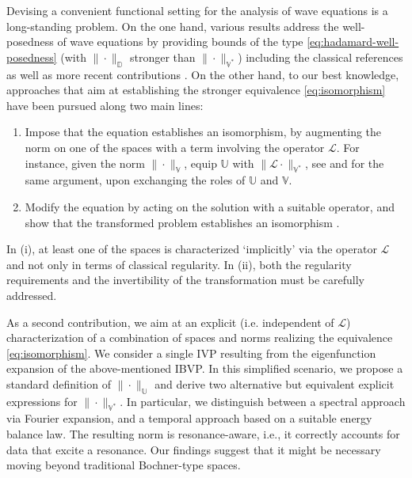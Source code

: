 \documentclass{amsart}
\theoremstyle{plain}
\theoremstyle{remark}
\numberwithin{equation}{section}
\numberwithin{theorem}{section}
\newcommand{\trial}{\mathbb{U}}
\newcommand{\test}{\mathbb{V}}
\newcommand{\data}{\mathbb{V}^*}
\begin{document}
Devising a convenient functional setting for the analysis of wave equations is a long-standing problem. On the one hand, various results address the well-posedness of wave equations by providing bounds of the type \eqref{eq:hadamard-well-posedness} (with $\|\cdot\|_{\mathbb{D}}$  stronger than  $\|\cdot\|_{\data}$) including the classical references \cite{Dautray.Lions:92, Evans:10, Ladyzhenskaya:85, Lions.Magenes:72} as well as more recent contributions \cite{Dong.Gergoulis.Mascotto.Wang:25, Dong.Mascotto.Wang:25, Ferrari.Perugia:25, Ferrari.Perugia.Zampa:25}.
On the other hand, to our best knowledge, approaches that aim at establishing the stronger equivalence \eqref{eq:isomorphism} have been pursued along two main lines:
\begin{enumerate}[label=(\roman*)]
	\item Impose that the equation establishes an isomorphism, by augmenting the norm on one of the spaces with a term involving the operator $\mathcal{L}$. For instance, given the norm $\|\cdot\|_{\test}$, equip $\trial$ with $\|\mathcal{L}\cdot \|_{\data}$, see \cite{Bignardi.Moiola:25, Fuhrer.Gonzalez.Karkulik:25, Steinbach.Zank:22, Zank:20} and \cite{Henning.Palitta.Simoncini.Urban:22} for the same argument, upon exchanging the roles of $\trial$ and $\test$.
	\vspace{5pt}
	\item Modify the equation by acting on the solution with a suitable operator, and show that the transformed problem establishes an isomorphism \cite{Bignardi.Moiola:25, Hoonhout.Loscher.UrzuaTorres:25}.
\end{enumerate} 
%
In (i), at least one of the spaces is characterized `implicitly' via the operator $\mathcal{L}$ and not only in terms of classical regularity. In (ii), both the regularity requirements and the invertibility of the transformation must be carefully addressed.

As a second contribution,  we aim at an explicit (i.e. independent of $\mathcal{L}$) characterization of a combination of spaces and norms realizing the equivalence \eqref{eq:isomorphism}. We consider a single IVP resulting from the eigenfunction expansion of the above-mentioned IBVP. In this simplified scenario, we propose a standard definition of $\|\cdot\|_\trial$ and derive two alternative but equivalent explicit expressions for $\|\cdot\|_{\data}$. In particular, we distinguish between a spectral approach via Fourier expansion, and a temporal approach based on a suitable energy balance law. The resulting norm is resonance-aware, i.e., it correctly accounts for data that excite a resonance.  Our findings suggest that it might be necessary moving beyond traditional Bochner-type spaces.
\end{document}
